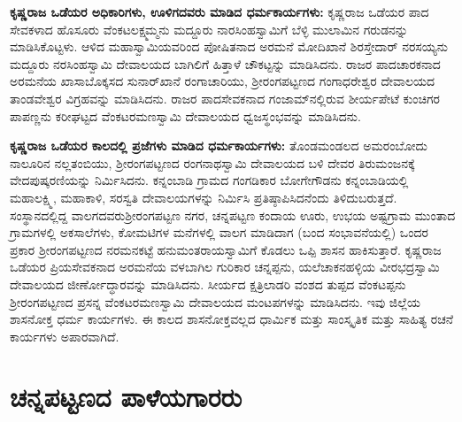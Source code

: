 \textbf{ಕೃಷ್ಣರಾಜ ಒಡೆಯರ ಅಧಿಕಾರಿಗಳು, ಊಳಿಗದವರು ಮಾಡಿದ ಧರ್ಮಕಾರ್ಯಗಳು: } ಕೃಷ್ಣರಾಜ ಒಡೆಯರ ಪಾದ ಸೇವಕಳಾದ ಹೊಸೂರು ವೆಂಕಟಲಕ್ಷ್ಮಮ್ಮನು ಮದ್ದೂರು ನಾರಸಿಂಹಸ್ವಾಮಿಗೆ ಬೆಳ್ಳಿ ಮುಲಾಮಿನ ಗರುಡನನ್ನು ಮಾಡಿಸಿ\-ಕೊಟ್ಟಳು. ಆಳಿದ ಮಹಾಸ್ವಾಮಿಯವರಿಂದ ಪೋಷಿತನಾದ ಅರಮನೆ ಮೋದಿಖಾನೆ ಶಿರಸ್ತೇದಾರ್​ ನರಸಯ್ಯನು ಮದ್ದೂರು ನರಸಿಂಹಸ್ವಾಮಿ ದೇವಾಲಯದ ಬಾಗಿಲಿಗೆ ಹಿತ್ತಾಳೆ ಚೌಕಟ್ಟನ್ನು ಮಾಡಿಸಿದನು. ರಾಜರ ಪಾದಚಾರಕನಾದ ಅರಮನೆಯ ಖಾಸಾಬೊಕ್ಕಸದ ಸುನಾರ್​ಖಾನೆ ರಂಗಾಚಾರಿಯು, ಶ‍್ರೀರಂಗಪಟ್ಟಣದ ಗಂಗಾಧರೇಶ್ವರ ದೇವಾಲಯದ ತಾಂಡವೇಶ್ವರ ವಿಗ್ರಹವನ್ನು ಮಾಡಿಸಿದನು. ರಾಜರ ಪಾದಸೇವಕನಾದ ಗಂಜಾಮ್‌ನಲ್ಲಿರುವ ಶೀರ್ಯಪೇಟೆ ಕುಂಚಿಗರ ಪಾಪಣ್ಣನು ಕರೀಘಟ್ಟದ ವೆಂಕಟರಮಣಸ್ವಾಮಿ ದೇವಾಲಯದ ಧ್ವಜಸ್ಥಂಭವನ್ನು ಮಾಡಿಸಿದನು.

\textbf{ಕೃಷ್ಣರಾಜ ಒಡೆಯರ ಕಾಲದಲ್ಲಿ ಪ್ರಜೆಗಳು ಮಾಡಿದ ಧರ್ಮಕಾರ್ಯಗಳು: } ತೊಂಡಮಂಡಲದ ಅಮರಂಬೋದು ನಾಲೂರಿನ ನಲ್ಲತಂಬಿಯು, ಶ‍್ರೀರಂಗಪಟ್ಟಣದ ರಂಗನಾಥಸ್ವಾಮಿ ದೇವಾಲಯದ ಬಳಿ ದೇವರ ತಿರುಮಂಜನಕ್ಕೆ ವೇದಪುಷ್ಕರಣಿ\-ಯನ್ನು ನಿರ್ಮಿಸಿದನು. ಕನ್ನಂಬಾಡಿ ಗ್ರಾಮದ ಗಂಗಡಿಕಾರ ಬೋಗೇಗೌಡನು ಕನ್ನಂಬಾಡಿಯಲ್ಲಿ ಮಹಾಲಕ್ಷ್ಮಿ, ಮಹಾಕಾಳಿ, ಸರಸ್ವತಿ ದೇವಾಲಯಗಳನ್ನು ನಿರ್ಮಿಸಿ ಪ್ರತಿಷ್ಠಾಪಿಸಿದನೆಂದು ತಿಳಿದುಬರುತ್ತದೆ. ಸಂಸ್ಥಾನದಲ್ಲಿದ್ದ ವಾಲಗದವರು\break ಶ‍್ರೀರಂಗಪಟ್ಟಣ ನಗರ, ಚನ್ನಪಟ್ಟಣ ಕಂದಾಯ ಊರು, ಉಭಯ ಅಷ್ಟಗ್ರಾಮ ಮುಂತಾದ ಗ್ರಾಮಗಳಲ್ಲಿ ಅಕಸಾಲೆಗಳು, ಕೋಮಟಿಗಳ ಮನೆಗಳಲ್ಲಿ ವಾಲಗ ಮಾಡಿದಾಗ (ಬಂದ ಸಂಭಾವನೆಯಲ್ಲಿ) ಒಂದರ ಪ್ರಕಾರ ಶ‍್ರೀರಂಗಪಟ್ಟಣದ ನರಮನಕಟ್ಟೆ ಹನುಮಂತರಾಯಸ್ವಾಮಿಗೆ ಕೊಡಲು ಒಪ್ಪಿ ಶಾಸನ ಹಾಕಿಸುತ್ತಾರೆ. ಕೃಷ್ಣರಾಜ ಒಡೆಯರ ಪ್ರಿಯಸೇವಕನಾದ ಅರಮನೆಯ ವಳಬಾಗಿಲ ಗುರಿಕಾರ ಚನ್ನಪ್ಪನು, ಯಲೆಚಾಕನಹಳ್ಳಿಯ ವೀರಭದ್ರಸ್ವಾಮಿ ದೇವಾಲಯದ ಜೀರ್ಣೋದ್ಧಾರವನ್ನು ಮಾಡಿಸಿ\-ದನು. ಸೀರ್ಯದ ಕ್ಷತ್ರಿಲಾಡರಿ ವಂಶದ ತುಪ್ಪದ ವೆಂಕಟಪ್ಪನು ಶ‍್ರೀರಂಗಪಟ್ಟಣದ ಪ್ರಸನ್ನ ವೆಂಕಟರಮಣಸ್ವಾಮಿ ದೇವಾಲಯದ ಮಂಟಪಗಳನ್ನು ಮಾಡಿಸಿದನು. ಇವು ಜಿಲ್ಲೆಯ ಶಾಸನೋಕ್ತ ಧರ್ಮ ಕಾರ್ಯಗಳು. ಈ ಕಾಲದ ಶಾಸನೋಕ್ತವಲ್ಲದ ಧಾರ್ಮಿಕ ಮತ್ತು ಸಾಂಸ್ಕೃತಿಕ ಮತ್ತು ಸಾಹಿತ್ಯ ರಚನೆ ಕಾರ್ಯಗಳು ಅಪಾರವಾಗಿದೆ.

\section*{ಚನ್ನಪಟ್ಟಣದ ಪಾಳೆಯಗಾರರು}

